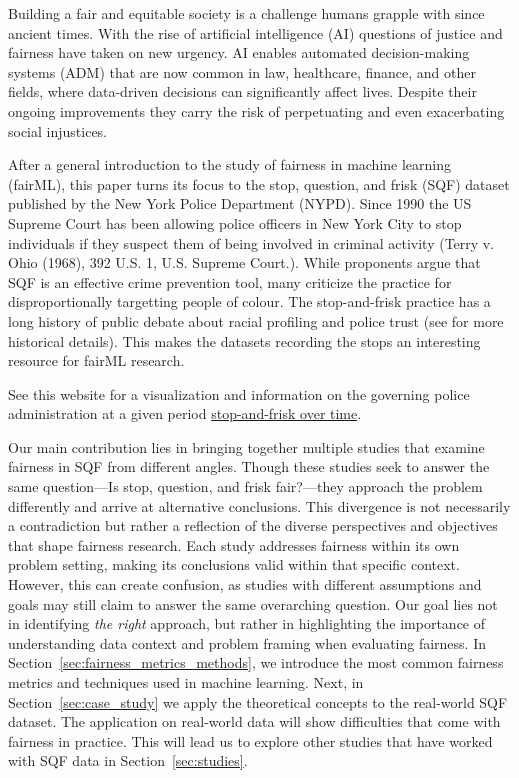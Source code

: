 
Building a fair and equitable society is a challenge humans grapple with since ancient times. With the rise of artificial intelligence (AI) questions of justice and fairness have taken on new urgency. AI enables automated decision-making systems (ADM) that are now common in law, healthcare, finance, and other fields, where data-driven decisions can significantly affect lives. Despite their ongoing improvements they carry the risk of perpetuating and even exacerbating social injustices. 



After a general introduction to the study of fairness in machine learning (fairML), this paper turns its focus to the stop, question, and frisk (SQF) dataset published by the New York Police Department (NYPD). Since 1990 the US Supreme Court has been allowing police officers in New York City to stop individuals if they suspect them of being involved in criminal activity (Terry v. Ohio (1968), 392 U.S. 1, U.S. Supreme Court.). While proponents argue that SQF is an effective crime prevention tool, many criticize the practice for disproportionally targetting people of colour. The stop-and-frisk practice has a long history of public debate about racial profiling and police trust (see \cite{gelman2007} for more historical details). This makes the datasets recording the stops an interesting resource for fairML research.

See this website for a visualization and information on the governing police administration at a given period \href{https://www.nyclu.org/data/stop-and-frisk-data}{stop-and-frisk over time}.

Our main contribution lies in bringing together multiple studies that examine fairness in SQF from different angles. Though these studies seek to answer the same question—Is stop, question, and frisk fair?—they approach the problem differently and arrive at alternative conclusions.
This divergence is not necessarily a contradiction but rather a reflection of the diverse perspectives and objectives that shape fairness research. Each study addresses fairness within its own problem setting, making its conclusions valid within that specific context. However, this can create confusion, as studies with different assumptions and goals may still claim to answer the same overarching question. Our goal lies not in identifying \textit{the right} approach, but rather in highlighting the importance of understanding data context and problem framing when evaluating fairness.
In Section~\ref{sec:fairness_metrics_methods}, we introduce the most common fairness metrics and techniques used in machine learning.
Next, in Section~\ref{sec:case_study} we apply the theoretical concepts to the real-world SQF dataset. 
The application on real-world data will show difficulties that come with fairness in practice.
This will lead us to explore other studies that have worked with SQF data in Section~\ref{sec:studies}. 


